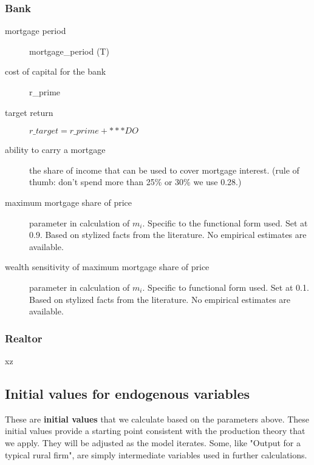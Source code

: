 \subsubsection{Bank} %
\begin{description}
\item [mortgage period]  mortgage\_period (T)
\item [cost of capital for the bank] r\_prime
\item [target return] $r\_target = r\_prime + ***DO$

\item [{ability to carry a mortgage}] the share of income that can be used to cover mortgage interest. (rule of thumb: don't spend more than 25\% or 30\% we use 0.28.)
\item [maximum mortgage share of price] parameter in calculation of $m_i$. Specific to the functional form used. Set at 0.9. Based on stylized facts from the literature.  No empirical estimates are available. 
\item [wealth sensitivity of maximum mortgage share of price] parameter in calculation of $m_i$. Specific to functional form used. Set at 0.1. Based on stylized facts from the literature.  No empirical estimates are available. 

\end{description}

\subsubsection{Realtor}
\begin{description}
\item[xz] 
\end{description}


\subsection{Initial values for endogenous variables} \label{sec-init-value-list}

These are \textbf{initial values} that we calculate based on the parameters above. These initial values provide  a starting point consistent with the production theory that we apply. They will be adjusted as the model iterates.  Some, like "Output for a typical rural firm", are simply intermediate variables used in further calculations.%

